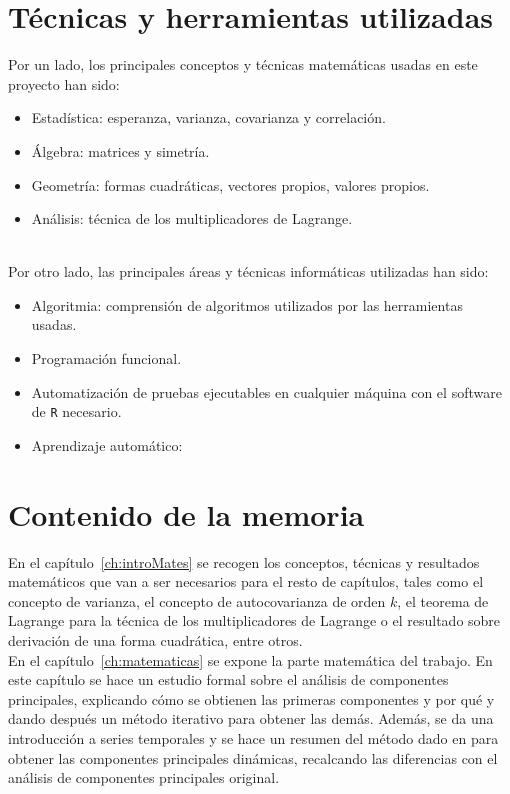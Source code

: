 \section{Técnicas y herramientas utilizadas}
Por un lado, los principales conceptos y técnicas matemáticas usadas en este proyecto han sido:
\begin{itemize}
\item Estadística: esperanza, varianza, covarianza y correlación.
\item Álgebra: matrices y simetría.
\item Geometría: formas cuadráticas, vectores propios, valores propios.
\item Análisis: técnica de los multiplicadores de Lagrange.
\end{itemize}
\textit{ }\\
Por otro lado, las principales áreas y técnicas informáticas utilizadas han sido:
\begin{itemize}
\item Algoritmia: comprensión de algoritmos utilizados por las herramientas usadas.
\item Programación funcional.
\item Automatización de pruebas ejecutables en cualquier máquina con el software de \texttt{R} necesario.
\item Aprendizaje automático:
\end{itemize}


\section{Contenido de la memoria}
En el capítulo~\ref{ch:introMates} se recogen los conceptos, técnicas y resultados matemáticos que van a ser necesarios para el resto de capítulos, tales como el concepto de varianza, el concepto de autocovarianza de orden $k$, el teorema de Lagrange para la técnica de los multiplicadores de Lagrange o el resultado sobre derivación de una forma cuadrática, entre otros.\\

En el capítulo~\ref{ch:matematicas} se expone la parte matemática del trabajo. En este capítulo se hace un estudio formal sobre el análisis de componentes principales, explicando cómo se obtienen las primeras componentes y por qué y dando después un método iterativo para obtener las demás. Además, se da una introducción a series temporales y se hace un resumen del método dado en \cite{pena16} para obtener las componentes principales dinámicas, recalcando las diferencias con el análisis de componentes principales original.\\


